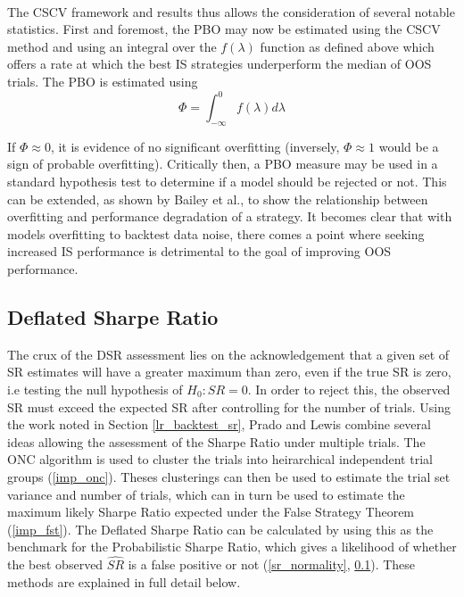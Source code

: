 \documentclass[a4paper,11pt,oneside]{article}
\theoremstyle{plain}
\theoremstyle{definition}
\begin{document}
	
	
	\texttt{\\}
	\newline The CSCV framework and results thus allows the consideration of several notable statistics. First and foremost, 
	the PBO may now be estimated using the CSCV method and using an integral over the $f(\lambda)$ function 
	as defined above which offers a rate at which the best IS strategies underperform the median of OOS trials. The PBO is estimated using
	\begin{equation}
	\Phi = \int_{-\infty}^{0} f (\lambda) d \lambda
	\end{equation}
	
	
	If $\Phi \approx 0$,
	it is evidence of no significant overfitting (inversely, $\Phi \approx 1$ would be a sign of probable overfitting). Critically then, a PBO measure may be used in a standard hypothesis test to determine if a model should be rejected or not. This 
	can be extended, as shown by Bailey et al., to show the relationship between overfitting and performance 
	degradation of a strategy. It becomes clear that with models overfitting to backtest data noise, there comes a point 
	where seeking increased IS performance is detrimental to the goal of improving OOS performance.  
	\hfill \break 
	
	
	\subsection{Deflated Sharpe Ratio}\label{imp_dsr}
	
	The crux of the DSR assessment lies on the acknowledgement that a given set of SR estimates will have a greater maximum than zero, even if the true SR is zero, i.e testing the null hypothesis of $H_0:SR=0$. In order to reject this, the observed SR must exceed the expected SR after controlling for the number of trials. Using the 
	work noted in Section \ref{lr_backtest_sr}, Prado and Lewis combine several ideas allowing the assessment of the Sharpe Ratio under multiple trials. The ONC algorithm is used to cluster the trials into heirarchical independent trial groups (\ref{imp_onc}). Theses clusterings can then be used to estimate the trial set variance and number of trials, which can in turn be used to estimate the maximum likely Sharpe Ratio expected under the False Strategy Theorem (\ref{imp_fst}). The Deflated Sharpe Ratio can be calculated by using this as the benchmark for the Probabilistic Sharpe Ratio, which gives a likelihood of whether the best observed $\widehat{SR}$ is a false positive or not (\ref{sr_normality}, \ref{imp_dsr}). These methods are explained in full detail below.
	
\end{document}
